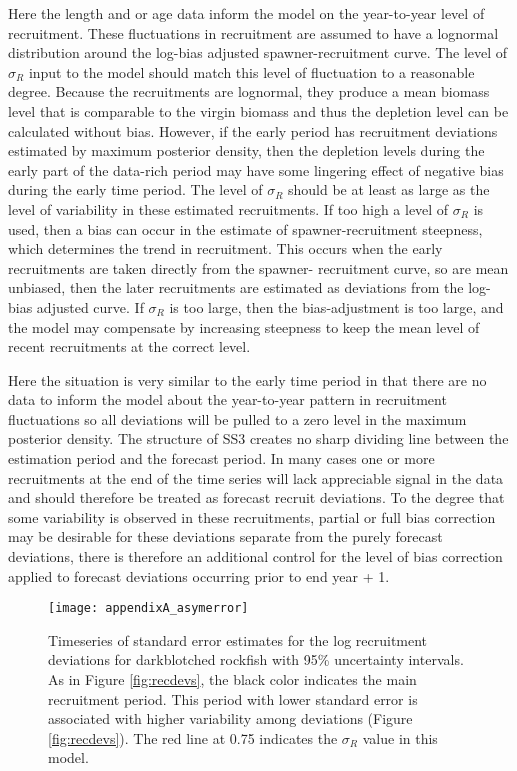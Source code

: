 Here the length and or age data inform the model on the year-to-year level of recruitment. These fluctuations in recruitment are assumed to have a lognormal distribution around the log-bias adjusted spawner-recruitment curve.  The level of $\sigma_R$ input to the model should match this level of fluctuation to a reasonable degree. Because the recruitments are lognormal, they produce a mean biomass level that is comparable to the virgin biomass and thus the depletion level can be calculated without bias. However, if the early period has recruitment deviations estimated by maximum posterior density, then the depletion levels during the early part of the data-rich period may have some lingering effect of negative bias during the early time period. The level of $\sigma_R$ should be at least as large as the level of variability in these estimated recruitments. If too high a level of $\sigma_R$ is used, then a bias can occur in the estimate of spawner-recruitment steepness, which determines the trend in recruitment. This occurs when the early recruitments are taken directly from the spawner- recruitment curve, so are mean unbiased, then the later recruitments are estimated as deviations from the log-bias adjusted curve. If $\sigma_R$ is too large, then the bias-adjustment is too large, and the model may compensate by increasing steepness to keep the mean level of recent recruitments at the correct level.

Here the situation is very similar to the early time period in that there are no data to inform the model about the year-to-year pattern in recruitment fluctuations so all deviations will be pulled to a zero level in the maximum posterior density. The structure of SS3 creates no sharp dividing line between the estimation period and the forecast period. In many cases one or more recruitments at the end of the time series will lack appreciable signal in the data and should therefore be treated as forecast recruit deviations. To the degree that some variability is observed in these recruitments, partial or full bias correction may be desirable for these deviations separate from the purely forecast deviations, there is therefore an additional control for the level of bias correction applied to forecast deviations occurring prior to end year + 1.

\begin{figure}[H]
	\begin{center}
	\texttt{[image: appendixA\_asymerror]}\\
	\end{center}
	\caption{Timeseries of standard error estimates for the log recruitment deviations for darkblotched rockfish with 95\% uncertainty intervals. As in Figure \ref{fig:recdevs}, the black color indicates the main recruitment period. This period with lower standard error is associated with higher variability among deviations (Figure \ref{fig:recdevs}). The red line at 0.75 indicates the  $\sigma_R$ value in this model.}
	\label{fig:recSE}
\end{figure}


